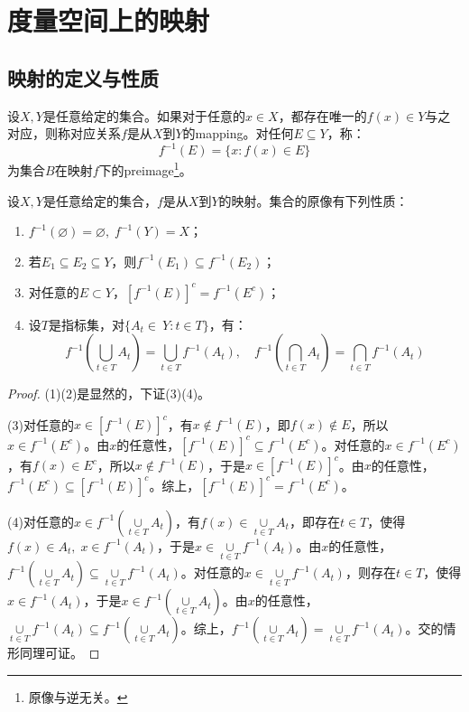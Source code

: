 \section{度量空间上的映射}
\subsection{映射的定义与性质}
\begin{definition}
	设$X,Y$是任意给定的集合。如果对于任意的$x\in X$，都存在唯一的$f(x)\in Y$与之对应，则称对应关系$f$是从$X$到$Y$的\gls{mapping}。对任何$E\subseteq Y$，称：
	\begin{equation*}
		f^{-1}(E)=\{x:f(x)\in E\}
	\end{equation*}
	为集合$B$在映射$f$下的\gls{preimage}\footnote{原像与逆无关。}。
\end{definition}
\begin{theorem}\label{theo:PropertyOfPreimage}
	设$X,Y$是任意给定的集合，$f$是从$X$到$Y$的映射。集合的原像有下列性质：
	\begin{enumerate}
		\item $f^{-1}(\varnothing)=\varnothing,\;f^{-1}(Y)=X$；
		\item 若$E_1\subseteq E_2\subseteq Y$，则$f^{-1}(E_1)\subseteq f^{-1}(E_2)$；
		\item 对任意的$E\subset Y$，$[f^{-1}(E)]^c=f^{-1}(E^c)$；
		\item 设$T$是指标集，对$\{A_t\in\ Y:t\in T\}$，有：
		\begin{equation*}
			f^{-1}\left(\underset{t\in T}{\bigcup}A_t\right)=\underset{t\in T}{\bigcup}f^{-1}(A_t), \quad
			f^{-1}\left(\underset{t\in T}{\bigcap}A_t\right)=\underset{t\in T}{\bigcap}f^{-1}(A_t)
		\end{equation*}
	\end{enumerate}
\end{theorem}
\begin{proof}
	(1)(2)是显然的，下证(3)(4)。\par
	(3)对任意的$x\in[f^{-1}(E)]^c$，有$x\notin f^{-1}(E)$，即$f(x)\notin E$，所以$x\in f^{-1}(E^c)$。由$x$的任意性，$[f^{-1}(E)]^c\subseteq f^{-1}(E^c)$。对任意的$x\in f^{-1}(E^c)$，有$f(x)\in E^c$，所以$x\notin f^{-1}(E)$，于是$x\in[f^{-1}(E)]^c$。由$x$的任意性，$f^{-1}(E^c)\subseteq[f^{-1}(E)]^c$。综上，$[f^{-1}(E)]^c=f^{-1}(E^c)$。\par
	(4)对任意的$x\in f^{-1}\left(\underset{t\in T}{\cup}A_t\right)$，有$f(x)\in\underset{t\in T}{\cup}A_t$，即存在$t\in T$，使得$f(x)\in A_t,\;x\in f^{-1}(A_t)$，于是$x\in\underset{t\in T}{\cup}f^{-1}(A_t)$。由$x$的任意性，$f^{-1}\left(\underset{t\in T}{\cup}A_t\right)\subseteq\underset{t\in T}{\cup}f^{-1}(A_t)$。对任意的$x\in\underset{t\in T}{\cup}f^{-1}(A_t)$，则存在$t\in T$，使得$x\in f^{-1}(A_t)$，于是$x\in f^{-1}\left(\underset{t\in T}{\cup}A_t\right)$。由$x$的任意性，$\underset{t\in T}{\cup}f^{-1}(A_t)\subseteq f^{-1}\left(\underset{t\in T}{\cup}A_t\right)$。综上，$f^{-1}\left(\underset{t\in T}{\cup}A_t\right)=\underset{t\in T}{\cup}f^{-1}(A_t)$。交的情形同理可证。
\end{proof}
